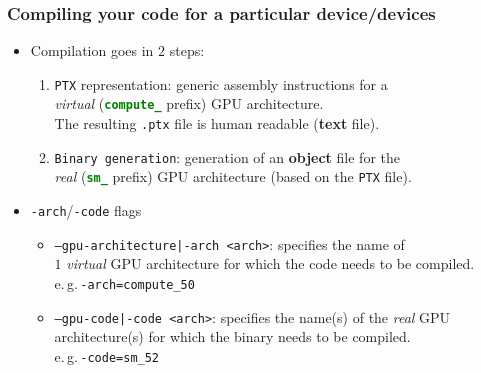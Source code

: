 \begin{frame}
   \frametitle{Compiling your code for a particular device/devices}
      \begin{itemize}
         \item Compilation goes in $2$ steps:
            \begin{enumerate}
		    \item \texttt{PTX} representation: generic assembly instructions for a \\ 
			    \textit{virtual} (\textcolor{green}{\textbf{\texttt{compute\_}}} prefix) GPU architecture.\\
			    The resulting \texttt{.ptx} file is human readable (\textbf{text} file).
		    \item \texttt{Binary generation}: generation of an \textbf{object} file for the \\
			    \textit{real} (\textbf{\textcolor{green}{\texttt{sm\_}}} prefix) 
			    GPU architecture (based on the \texttt{PTX} file).		    
            \end{enumerate}
         \item \texttt{-arch}/\texttt{-code} flags
            \begin{itemize}
	       \item \texttt{--gpu-architecture|-arch <arch>}: specifies the name of \\ 
		       $1$ \textit{virtual} GPU architecture for which the code needs to be compiled.\\
			  e.\,g.\,\texttt{-arch=compute\_50}   
	       \item \texttt{--gpu-code|-code <arch>}: specifies the name(s) of the \textit{real}
			  GPU architecture(s) for which the binary needs to be compiled.\\
			    e.\,g.\,\texttt{-code=sm\_52}  
	    \end{itemize} 
      \end{itemize} 
\end{frame}

